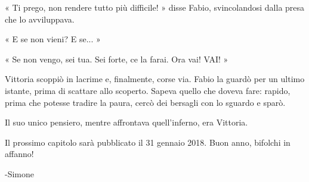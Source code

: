 « Ti prego, non rendere tutto più difficile! » disse Fabio, svincolandosi dalla presa che lo avviluppava.

« E se non vieni? E se... »

« Se non vengo, sei tua. Sei forte, ce la farai. Ora vai! VAI! »

Vittoria scoppiò in lacrime e, finalmente, corse via. Fabio la guardò per un ultimo istante, prima di scattare allo scoperto. Sapeva quello che doveva fare: rapido, prima che potesse tradire la paura, cercò dei bersagli con lo sguardo e sparò.

Il suo unico pensiero, mentre affrontava quell'inferno, era Vittoria.

Il prossimo capitolo sarà pubblicato il 31 gennaio 2018. Buon anno, bifolchi in affanno!

-Simone



